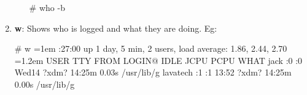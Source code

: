 \begin{flushleft}
\begin{enumerate}
\begin{itemize}
\begin{tcolorbox}[breakable,notitle,boxrule=-0pt,colback=black,colframe=black]
				\color{green}
				\# who -b
			\end{tcolorbox}
		\end{itemize}
		\bigskip
		\item \textbf{w}: Shows who is logged and what they are doing.
			\newline
			Eg:
			\begin{tcolorbox}[breakable,notitle,boxrule=-0pt,colback=black,colframe=black]
				\color{green}
				\# w
				\color{white}
				\small
				\font=1em
				:27:00 up 1 day, 5 min,  2 users,  load average: 1.86, 2.44, 2.70
				\newline
				\font=1.2em
				USER     TTY      FROM             LOGIN@   IDLE   JCPU   PCPU WHAT
				\newline
				jack   :0       :0               Wed14   ?xdm?  14:25m  0.03s /usr/lib/g
				\newline
				lavatech :1       :1               13:52   ?xdm?  14:25m  0.00s /usr/lib/g
				\newline
				\font=4pt
			\end{tcolorbox}
			

\end{enumerate}
\end{flushleft}
